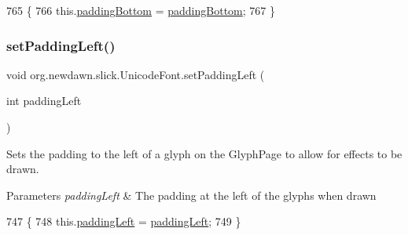 \begin{DoxyCode}
765                                                     \{
766         this.\mbox{\hyperlink{classorg_1_1newdawn_1_1slick_1_1_unicode_font_a101f8814305c63cba7b7bbb7d1bf87ae}{paddingBottom}} = \mbox{\hyperlink{classorg_1_1newdawn_1_1slick_1_1_unicode_font_a101f8814305c63cba7b7bbb7d1bf87ae}{paddingBottom}};
767     \}
\end{DoxyCode}
\mbox{\label{classorg_1_1newdawn_1_1slick_1_1_unicode_font_a0ec91919e6999efd6ac061d3d8531c1e}} 
\subsubsection{\texorpdfstring{set\+Padding\+Left()}{setPaddingLeft()}}
{\footnotesize\ttfamily void org.\+newdawn.\+slick.\+Unicode\+Font.\+set\+Padding\+Left (\begin{DoxyParamCaption}\item[{int}]{padding\+Left }\end{DoxyParamCaption})\hspace{0.3cm}{\ttfamily [inline]}}

Sets the padding to the left of a glyph on the Glyph\+Page to allow for effects to be drawn.


\begin{DoxyParams}{Parameters}
{\em padding\+Left} & The padding at the left of the glyphs when drawn \\
\hline
\end{DoxyParams}

\begin{DoxyCode}
747                                                 \{
748         this.\mbox{\hyperlink{classorg_1_1newdawn_1_1slick_1_1_unicode_font_a2c0919e4c3c800093767e29827064b0e}{paddingLeft}} = \mbox{\hyperlink{classorg_1_1newdawn_1_1slick_1_1_unicode_font_a2c0919e4c3c800093767e29827064b0e}{paddingLeft}};
749     \}
\end{DoxyCode}
\mbox{\label{classorg_1_1newdawn_1_1slick_1_1_unicode_font_ae2a1a2e1a175ea26c748a41efa3578a5}} 
